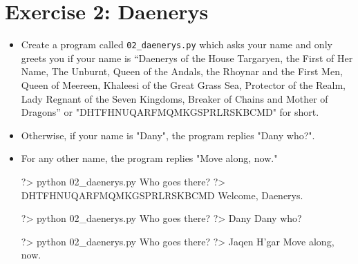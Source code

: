 \documentclass{42-en}
\begin{document}
\nextexercice
\newpage

\chapter{Exercise 2: Daenerys}
\makeheaderfiles

\begin{itemize}

\item Create a program called \texttt{02\_daenerys.py} which asks your name and only greets you if your name is “Daenerys of the House Targaryen, the First of Her Name, The Unburnt, Queen of the Andals, the Rhoynar and the First Men, Queen of Meereen, Khaleesi of the Great Grass Sea, Protector of the Realm, Lady Regnant of the Seven Kingdoms, Breaker of Chains and Mother of Dragons” or "DHTFHNUQARFMQMKGSPRLRSKBCMD" for short. 
\item Otherwise, if your name is "Dany", the program replies "Dany who?". 
\item For any other name, the program replies "Move along, now."

\begin{42console}
	?> python 02_daenerys.py
	Who goes there?
	?> DHTFHNUQARFMQMKGSPRLRSKBCMD
	Welcome, Daenerys.
\end{42console}

\begin{42console}
	?> python 02_daenerys.py
	Who goes there?
	?> Dany
	Dany who?
\end{42console}

\begin{42console}
	?> python 02_daenerys.py
	Who goes there?
	?> Jaqen H'gar
	Move along, now.
\end{42console}

\end{itemize}
\end{document}
